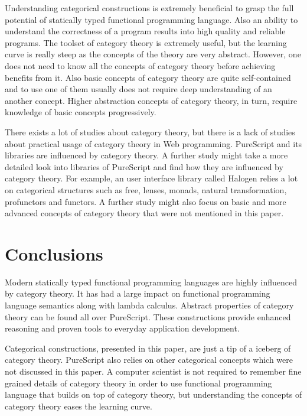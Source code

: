\documentclass[article]{aaltoseries}
\begin{document}
Understanding categorical constructions is extremely beneficial to grasp the
full potential of statically typed functional programming language. Also an
ability to understand the correctness of a program results into high quality and
reliable programs. The toolset of category theory is extremely useful, but the
learning curve is really steep as the concepts of the theory are very abstract.
However, one does not need to know all the concepts of category theory before
achieving benefits from it. Also basic concepts of category theory are quite
self-contained and to use one of them usually does not require deep
understanding of an another concept. Higher abstraction concepts of category
theory, in turn, require knowledge of basic concepts progressively.
 
There exists a lot of studies about category theory, but there is a lack of
studies about practical usage of category theory in Web programming. PureScript
and its libraries are influenced by category theory. A further study might take
a more detailed look into libraries of PureScript and find how they are
influenced by category theory. For example, an user interface library called
Halogen relies a lot on categorical structures such as free, lenses, monads,
natural transformation, profunctors and functors. A further study might also
focus on basic and more advanced concepts of category theory that were not
mentioned in this paper.



\section{Conclusions}

Modern statically typed functional programming languages are highly influenced
by category theory. It has had a large impact on functional programming
language semantics along with lambda calculus. Abstract properties of category
theory can be found all over PureScript. These constructions provide enhanced
reasoning and proven tools to everyday application development.
 
Categorical constructions, presented in this paper, are just a tip of a
iceberg of category theory. PureScript also relies on other categorical concepts
which were not discussed in this paper. A computer scientist is not required to
remember fine grained details of category theory in order to use functional
programming language that builds on top of category theory, but understanding
the concepts of category theory eases the learning curve.




\end{document}
